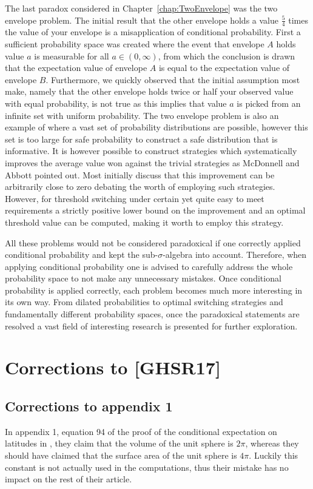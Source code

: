\documentclass[a4paper]{report}
\theoremstyle{plain}
\theoremstyle{definition}
\theoremstyle{remark}
\numberwithin{equation}{chapter}
\DeclareMathOperator{\1}{\mathbbm{1}}
\begin{document}
The last paradox considered in Chapter~\ref{chap:TwoEnvelope} was the two envelope problem. The initial result that the other envelope holds a value $\frac{5}{4}$ times the value of your envelope is a misapplication of conditional probability. First a sufficient probability space was created where the event that envelope $A$ holds value $a$ is measurable for all $a\in(0,\infty)$, from which the conclusion is drawn that the expectation value of envelope $A$ is equal to the expectation value of envelope $B$. Furthermore, we quickly observed that the initial assumption most make, namely that the other envelope holds twice or half your observed value with equal probability, is not true as this implies that value $a$ is picked from an infinite set with uniform probability. The two envelope problem is also an example of where a vast set of probability distributions are possible, however this set is too large for safe probability to construct a safe distribution that is informative. It is however possible to construct strategies which systematically improves the average value won against the trivial strategies as McDonnell and Abbott \cite{McDonnell09,Abbott10,McDonnell11} pointed out. Most initially discuss that this improvement can be arbitrarily close to zero debating the worth of employing such strategies. However, for threshold switching under certain yet quite easy to meet requirements a strictly positive lower bound on the improvement and an optimal threshold value can be computed, making it worth to employ this strategy.

All these problems would not be considered paradoxical if one correctly applied conditional probability and kept the sub-$\sigma$-algebra into account. Therefore, when applying conditional probability one is advised to carefully address the whole probability space to not make any unnecessary mistakes. Once conditional probability is applied correctly, each problem becomes much more interesting in its own way. From dilated probabilities to optimal switching strategies and fundamentally different probability spaces, once the paradoxical statements are resolved a vast field of interesting research is presented for further exploration.




\appendix
\chapter{Corrections to [GHSR17]}
\section{Corrections to appendix 1}\label{app:CorLong}
In appendix 1, equation 94 of the proof of the conditional expectation on latitudes in \cite{Gyenis17}, they claim that the volume of the unit sphere is $2\pi$, whereas they should have claimed that the surface area of the unit sphere is $4\pi$. Luckily this constant is not actually used in the computations, thus their mistake has no impact on the rest of their article.
\end{document}
